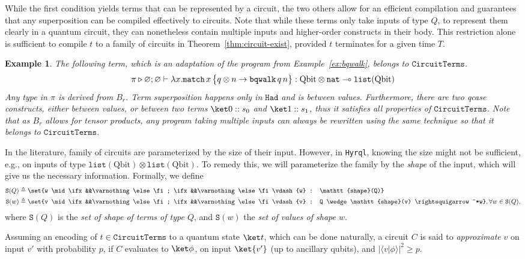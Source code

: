 \documentclass[10pt,a4paper]{article}
\newcommand{\qbit}{\mathrm{Qbit}}
\newcommand{\linfunc}{\multimap}
\newcommand{\nat}{\mathtt{nat}}
\newcommand{\typelist}[1]{\mathtt{list}(#1)}
\newcommand{\textmatch}{\ensuremath{\mathtt{match}}}
\newcommand{\zket}{\ket 0}
\newcommand{\oket}{\ket 1}
\newcommand{\match}[2]{
  \textmatch\,#1\left\{\! \begin{aligned} #2 \end{aligned}\right\}
}
\newcommand{\lbd}[2]{\lambda #1 .#2}
\newcommand{\shape}[1]{\mathtt{shape}(#1)}
\newcommand{\typing}[4]{
  \ifx&#1&\varnothing \else #1\fi; 
  \ifx&#2&\varnothing \else #2\fi 
  \vdash {#3} : #4
}
\newcommand{\closedtyping}[2]{\typing{}{}{#1}{#2}}
\newcommand{\reduces}{\rightsquigarrow}
\newcommand{\sreduces}{\reduces^*}
\newcommand{\circuittype}{\ensuremath{\mathtt{CircuitTerms}}}
\newcommand{\shapeset}[1]{\mathtt{S}(#1)}
\newcommand{\bqwalk}{\mathtt{bqwalk}}
\newcommand{\hyrql}{{{\tt{Hyrql}}}}
\newtheorem{example}[theorem]{Example}
\begin{document}
While the first condition yields terms that can be represented
by a circuit, the two others allow for an efficient compilation and 
guarantees that any superposition can be compiled effectively to circuits.
Note that while these terms only take inputs of type $Q$, to represent
them clearly in a quantum circuit, they can nonetheless contain
multiple inputs and higher-order constructs in their body.
This restriction alone is sufficient to compile $t$ to a family of circuits in
Theorem~\ref{thm:circuit-exist}, provided $t$ terminates for a given time $T$.

\begin{example}
  \label{ex:bqwalk-adapt}
  The following term, which is an adaptation of the program from
  Example~\ref{ex:bqwalk}, belongs to $\circuittype$. 
  \[
    \pi \triangleright \closedtyping {\lbd x \match x {q \otimes n \to
    \bqwalk\,q\,n}} {\qbit \otimes \nat \linfunc \typelist \qbit}
  \]
  Any type in $\pi$ is derived from $B_r$. Term superposition happens only in
  $\mathtt{Had}$ and is between values. Furthermore, there are two qcase
  constructs, either between values, or between two terms $\zket :: s_0$ and
  $\oket :: s_1$, thus it satisfies all properties of $\circuittype$. Note that
  as $B_r$ allows for tensor products, any program taking multiple inputs can
  always be rewritten using the same technique so that it belongs to
  $\circuittype$.
\end{example}

In the literature, family of circuits are parameterized by the size
of their input. However, in \hyrql{}, knowing the size might not be sufficient,
e.g., on inputs of type $\typelist \qbit \otimes \typelist \qbit$. 
To remedy this, we will parameterize the family by the \emph{shape} of the
input, which will give us the necessary information. Formally, we define
\[
  \begin{aligned}
    \shapeset Q &\triangleq \set{w \mid \closedtyping w \shape Q} \\
    \shapeset w &\triangleq \set{v \mid \closedtyping v Q \wedge \shape v
    \sreduces w}, \forall w \in \shapeset Q,
  \end{aligned}
\]
where $\shapeset Q$ is the \emph{set of shape of terms of type $Q$}, and
$\shapeset w$ the \emph{set of values of shape $w$}.

Assuming an encoding of $t \in \circuittype$ to a quantum state $\ket t$, which
can be done naturally, a circuit $C$ is said to \emph{approximate} $v$ on input
$v'$ with probability $p$, if $C$ evaluates to $\ket \phi$, on input $\ket{v'}$
(up to ancillary qubits), and $\lvert \langle v | \phi \rangle \rvert^2 \geq
p$.
\end{document}
